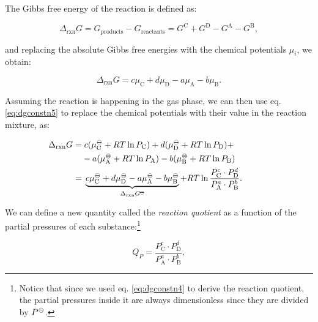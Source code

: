 \documentclass[
  9pt,
]{extbook}
\theoremstyle{definition}
\theoremstyle{definition}
\theoremstyle{definition}
\theoremstyle{definition}
\theoremstyle{remark}
\begin{document}
The Gibbs free energy of the reaction is defined as:

\begin{equation}
\Delta_{\text{rxn}} G = G_{\text{products}} - G_{\text{reactants}} = G^{\text{C}} + G^{\text{D}} - G^{\text{A}}-G^{\text{B}},
\label{eq:chemeq1}
\end{equation}

and replacing the absolute Gibbs free energies with the chemical potentials \(\mu_i\), we obtain:

\begin{equation}
\Delta_{\text{rxn}} G = c \mu_{\text{C}} + d \mu_{\text{D}} - a \mu_{\text{A}}- b\mu_{\text{B}}.
\label{eq:chemeq2}
\end{equation}

Assuming the reaction is happening in the gas phase, we can then use eq. \eqref{eq:dgconstn5} to replace the chemical potentials with their value in the reaction mixture, as:

\begin{equation}
\begin{aligned}
\mkern-60mu \Delta_{\text{rxn}} G =& \; c (\mu_{\text{C}}^{-\kern-6pt{\ominus}\kern-6pt-}+RT \ln P_{\text{C}}) + d (\mu_{\text{D}}^{-\kern-6pt{\ominus}\kern-6pt-}+RT \ln P_{\text{D}}) +\\ & - a (\mu_{\text{A}}^{-\kern-6pt{\ominus}\kern-6pt-}+RT \ln P_{\text{A}}) - b (\mu_{\text{B}}^{-\kern-6pt{\ominus}\kern-6pt-}+RT \ln P_{\text{B}}) \\
  =& \; \underbrace{c \mu_{\text{C}}^{-\kern-6pt{\ominus}\kern-6pt-}+ d \mu_{\text{D}}^{-\kern-6pt{\ominus}\kern-6pt-}- a \mu_{\text{A}}^{-\kern-6pt{\ominus}\kern-6pt-}- b\mu_{\text{B}}^{-\kern-6pt{\ominus}\kern-6pt-}}_{\Delta_{\text{rxn}} G^{-\kern-6pt{\ominus}\kern-6pt-}}  +RT \ln \frac{P_{\text{C}}^c \cdot P_{\text{D}}^d}{P_{\text{A}}^a \cdot P_{\text{B}}^b}.
\end{aligned}
\label{eq:chemeq3}
\end{equation}

We can define a new quantity called the \emph{reaction quotient} as a function of the partial pressures of each substance:\footnote{Notice that since we used eq. \eqref{eq:dgconstn4} to derive the reaction quotient, the partial pressures inside it are always dimensionless since they are divided by \(P^{-\kern-6pt{\ominus}\kern-6pt-}\).}

\begin{equation}
Q_P = \frac{P_{\text{C}}^c \cdot P_{\text{D}}^d}{P_{\text{A}}^a \cdot P_{\text{B}}^b},
\label{eq:chemeq4}
\end{equation}
\end{document}
